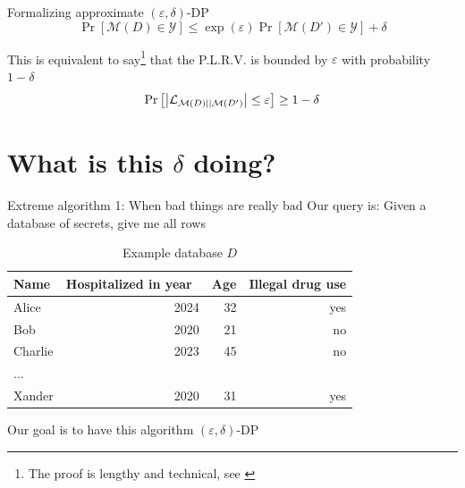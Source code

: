 \documentclass[12pt,aspectratio=169,handout]{beamer}
\begin{document}
\begin{frame}{Formalizing approximate $(\varepsilon, \delta)$-DP}
$$
\Pr[\mathcal{M}(D) \in \mathcal{Y}] \leq \exp(\varepsilon) \Pr[\mathcal{M}(D') \in \mathcal{Y}] + \delta
$$

This is equivalent to say\footnote{The proof is lengthy and technical, see \citet[pp.~44--47]{Dwork.Roth.2013}} that the P.L.R.V. is bounded by $\varepsilon$ with probability $1 - \delta$
$$
\Pr\left[\abs{\mathcal{L}_{\mathcal{M}(D) || \mathcal{M}(D')}} \leq \varepsilon \right]
\geq 1 - \delta
$$


\end{frame}


\section{What is this $\delta$ doing?}


\begin{frame}{Extreme algorithm 1: When bad things are really bad}
Our query is: Given a database of secrets, give me all rows

\begin{table}
\footnotesize
\begin{tabular}{lrrr} \toprule
Name & Hospitalized in year & Age & Illegal drug use \\ \midrule
Alice & 2024 & 32 & yes \\
Bob & 2020 & 21 & no \\
Charlie & 2023 & 45 & no \\
$\ldots$ & & & \\
Xander & 2020 & 31 & yes \\ \bottomrule
\end{tabular}
\caption{Example database $D$}
\end{table}

Our goal is to have this algorithm $(\varepsilon, \delta)$-DP

\end{frame}
\end{document}
